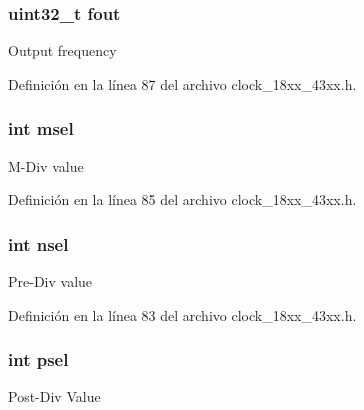 \subsubsection[{\texorpdfstring{fout}{fout}}]{\setlength{\rightskip}{0pt plus 5cm}uint32\+\_\+t fout}\hypertarget{struct_p_l_l___p_a_r_a_m___t_a09cb0437c53eac4c683dc592b6e8abf3}{}\label{struct_p_l_l___p_a_r_a_m___t_a09cb0437c53eac4c683dc592b6e8abf3}
Output frequency 

Definición en la línea 87 del archivo clock\+\_\+18xx\+\_\+43xx.\+h.

\subsubsection[{\texorpdfstring{msel}{msel}}]{\setlength{\rightskip}{0pt plus 5cm}int msel}\hypertarget{struct_p_l_l___p_a_r_a_m___t_a88dabd3e5dcfeffa266684c49ed2c4af}{}\label{struct_p_l_l___p_a_r_a_m___t_a88dabd3e5dcfeffa266684c49ed2c4af}
M-\/\+Div value 

Definición en la línea 85 del archivo clock\+\_\+18xx\+\_\+43xx.\+h.

\subsubsection[{\texorpdfstring{nsel}{nsel}}]{\setlength{\rightskip}{0pt plus 5cm}int nsel}\hypertarget{struct_p_l_l___p_a_r_a_m___t_a4039a5f518d03f563944c3ca79285fca}{}\label{struct_p_l_l___p_a_r_a_m___t_a4039a5f518d03f563944c3ca79285fca}
Pre-\/\+Div value 

Definición en la línea 83 del archivo clock\+\_\+18xx\+\_\+43xx.\+h.

\subsubsection[{\texorpdfstring{psel}{psel}}]{\setlength{\rightskip}{0pt plus 5cm}int psel}\hypertarget{struct_p_l_l___p_a_r_a_m___t_a372f2e371b89055c7bd0ce0b1cbb7999}{}\label{struct_p_l_l___p_a_r_a_m___t_a372f2e371b89055c7bd0ce0b1cbb7999}
Post-\/\+Div Value 

